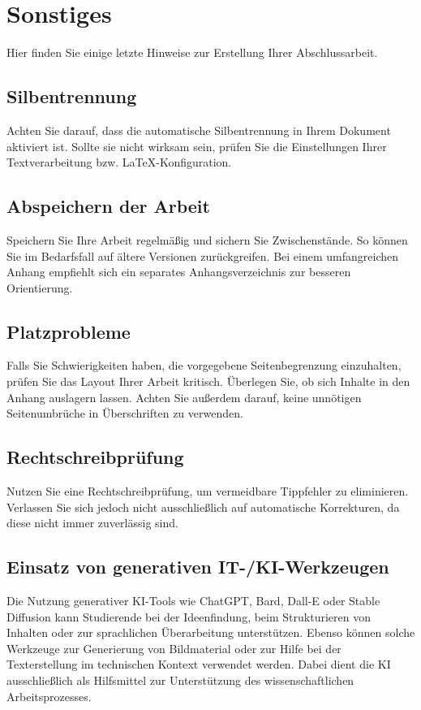 \section{Sonstiges}
Hier finden Sie einige letzte Hinweise zur Erstellung Ihrer Abschlussarbeit.

\subsection{Silbentrennung}
Achten Sie darauf, dass die automatische Silbentrennung in Ihrem Dokument aktiviert ist. Sollte sie nicht wirksam sein, prüfen Sie die Einstellungen Ihrer Textverarbeitung bzw. LaTeX-Konfiguration.

\subsection{Abspeichern der Arbeit}
Speichern Sie Ihre Arbeit regelmäßig und sichern Sie Zwischenstände. So können Sie im Bedarfsfall auf ältere Versionen zurückgreifen. Bei einem umfangreichen Anhang empfiehlt sich ein separates Anhangsverzeichnis zur besseren Orientierung.

\subsection{Platzprobleme}
Falls Sie Schwierigkeiten haben, die vorgegebene Seitenbegrenzung einzuhalten, prüfen Sie das Layout Ihrer Arbeit kritisch. Überlegen Sie, ob sich Inhalte in den Anhang auslagern lassen. Achten Sie außerdem darauf, keine unnötigen Seitenumbrüche in Überschriften zu verwenden.

\subsection{Rechtschreibprüfung}
Nutzen Sie eine Rechtschreibprüfung, um vermeidbare Tippfehler zu eliminieren. Verlassen Sie sich jedoch nicht ausschließlich auf automatische Korrekturen, da diese nicht immer zuverlässig sind.

\subsection{Einsatz von generativen IT-/KI-Werkzeugen}

Die Nutzung generativer KI-Tools wie ChatGPT, Bard, Dall-E oder Stable Diffusion kann Studierende bei der Ideenfindung, beim Strukturieren von Inhalten oder zur sprachlichen Überarbeitung unterstützen. Ebenso können solche Werkzeuge zur Generierung von Bildmaterial oder zur Hilfe bei der Texterstellung im technischen Kontext verwendet werden. Dabei dient die KI ausschließlich als Hilfsmittel zur Unterstützung des wissenschaftlichen Arbeitsprozesses.


